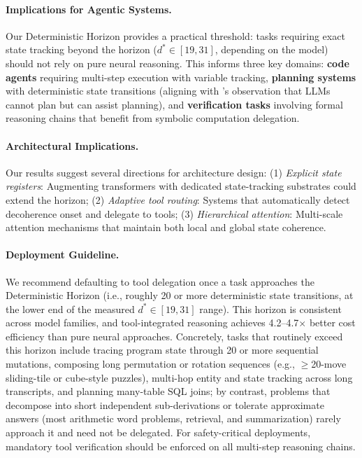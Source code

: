 \documentclass{article}
\theoremstyle{plain}
\theoremstyle{definition}
\theoremstyle{remark}
\begin{document}
\paragraph{Implications for Agentic Systems.} Our Deterministic Horizon provides a practical threshold: tasks requiring exact state tracking beyond the horizon ($d^* \in [19,31]$, depending on the model) should not rely on pure neural reasoning. This informs three key domains: \textbf{code agents} requiring multi-step execution with variable tracking, \textbf{planning systems} with deterministic state transitions (aligning with \citeauthor{kambhampati2024llms}'s observation that LLMs cannot plan but can assist planning), and \textbf{verification tasks} involving formal reasoning chains that benefit from symbolic computation delegation.

\paragraph{Architectural Implications.} Our results suggest several directions for architecture design: (1) \emph{Explicit state registers}: Augmenting transformers with dedicated state-tracking substrates could extend the horizon; (2) \emph{Adaptive tool routing}: Systems that automatically detect decoherence onset and delegate to tools; (3) \emph{Hierarchical attention}: Multi-scale attention mechanisms that maintain both local and global state coherence.

\paragraph{Deployment Guideline.}
We recommend defaulting to tool delegation once a task approaches the Deterministic Horizon (i.e., roughly 20 or more deterministic state transitions, at the lower end of the measured $d^* \in [19, 31]$ range). This horizon is consistent across model families, and tool-integrated reasoning achieves 4.2--4.7$\times$ better cost efficiency than pure neural approaches. Concretely, tasks that routinely exceed this horizon include tracing program state through 20 or more sequential mutations, composing long permutation or rotation sequences (e.g., $\geq$20-move sliding-tile or cube-style puzzles), multi-hop entity and state tracking across long transcripts, and planning many-table SQL joins; by contrast, problems that decompose into short independent sub-derivations or tolerate approximate answers (most arithmetic word problems, retrieval, and summarization) rarely approach it and need not be delegated. For safety-critical deployments, mandatory tool verification should be enforced on all multi-step reasoning chains.
\end{document}
